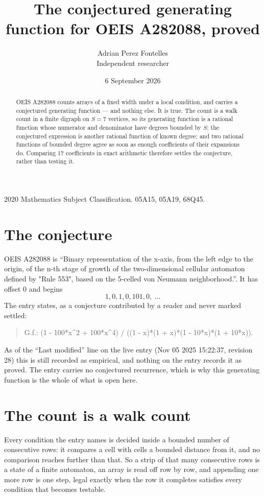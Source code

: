 \documentclass[11pt,a4paper]{article}
\title{The conjectured generating function for OEIS A282088, proved}
\author{Adrian Perez Fontelles\\ \small Independent researcher}
\date{6 September 2026}
\theoremstyle{plain}
\theoremstyle{definition}
\begin{document}
\maketitle

\begin{abstract}
OEIS A282088 counts arrays of a fixed width under a local condition, and carries a conjectured
generating function --- and nothing else. It is true. The count is a walk count in a finite
digraph on $S=7$ vertices, so its generating function is a rational function whose numerator
and denominator have degrees bounded by $S$; the conjectured expression is another rational
function of known degree; and two rational functions of bounded degree agree as soon as enough
coefficients of their expansions do. Comparing $17$ coefficients in exact arithmetic
therefore settles the conjecture, rather than testing it.
\end{abstract}

\noindent\small 2020 Mathematics Subject Classification. 05A15, 05A19, 68Q45.\normalsize

\section{The conjecture}

OEIS A282088 is ``Binary representation of the x-axis, from the left edge to the origin, of the n-th stage of growth of the two-dimensional cellular automaton defined by "Rule 553", based on the 5-celled von Neumann neighborhood.''. It has offset $0$ and begins
\[
1, 0, 1, 0, 101, 0,\ \dots
\]
The entry states, as a conjecture contributed by a reader and never marked settled:
\begin{quote}
G.f.: (1 - 100*x\^{}2 + 100*x\^{}4) / ((1 - x)*(1 + x)*(1 - 10*x)*(1 + 10*x)).
\end{quote}
As of the ``Last modified'' line on the live entry (Nov 05 2025 15:22:37, revision 28) this is still
recorded as empirical, and nothing on the entry records it as proved. The entry carries no
conjectured recurrence, which is why this generating function is the whole of what is open
here.

\section{The count is a walk count}

Every condition the entry names is decided inside a bounded number of consecutive rows: it
compares a cell with cells a bounded distance from it, and no comparison reaches further than
that. So a strip of that many consecutive rows is a state of a finite automaton, an array is
read off row by row, and appending one more row is one step, legal exactly when the row it
completes satisfies every condition that becomes testable.
\end{document}
